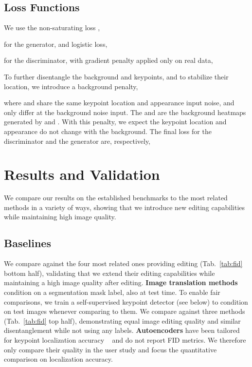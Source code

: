 \documentclass[10pt, conference, compsocconf]{IEEEtran}
\begin{document}
\subsection{Loss Functions}

 We use the non-saturating loss \cite{goodfellow2014generative},

for the generator, and logistic loss,

for the discriminator, with gradient penalty \cite{mescheder2018training} applied only on real data,



 To further disentangle the background and keypoints, and to stabilize their location, we introduce a background penalty,

where  and  share the same keypoint location and appearance input noise, and only differ at the background noise input. The  and  are the background heatmaps generated by  and . With this penalty, we expect the keypoint location and appearance do not change with the background.
The final loss for the discriminator and the generator are, respectively,

 \section{Results and Validation}   \label{experiments}

We compare our results on the established benchmarks to the most related methods in a variety of ways, showing that we introduce new editing capabilities while maintaining high image quality.

\subsection{Baselines}
We compare against the four most related ones providing editing (Tab.~\ref{tab:fid} bottom half), validating that we extend their editing capabilities while maintaining a high image quality after editing.
\textbf{Image translation methods} condition on a segmentation mask label, also at test time. To enable fair comparisons, we train a self-supervised keypoint detector (see below) to condition on test images whenever comparing to them. We compare against three methods (Tab.~\ref{tab:fid} top half), demonstrating equal image editing quality and similar disentanglement while not using any labels.
\textbf{Autoencoders} have been tailored for keypoint localization accuracy ~\cite{zhang2018unsupervised} and do not report FID metrics. We therefore only compare their quality in the user study and focus the quantitative comparison on localization accuracy.
\end{document}
